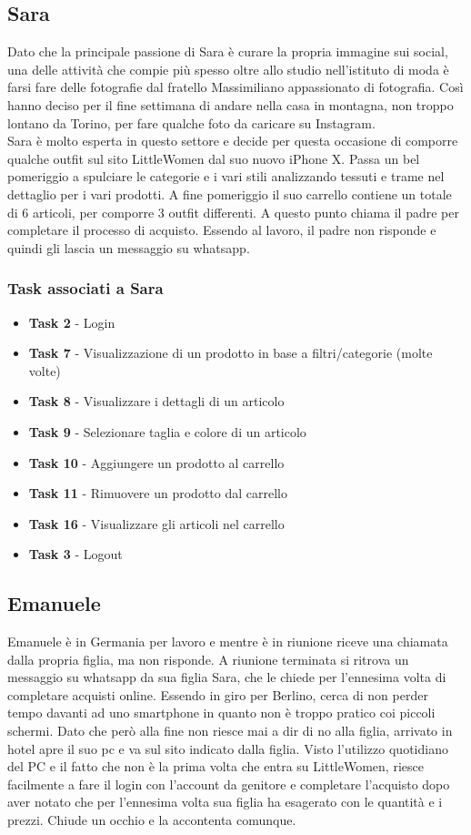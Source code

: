 \documentclass[12pt,a4paper]{report}
\begin{document}
\subsection*{Sara}
Dato che la principale passione di Sara è curare la propria immagine sui social, una delle attività che compie più spesso oltre allo studio nell'istituto di moda è farsi fare delle fotografie dal fratello Massimiliano appassionato di fotografia. Così hanno deciso per il fine settimana di andare nella casa in montagna, non troppo lontano da Torino, per fare qualche foto da caricare su Instagram.\\
Sara è molto esperta in questo settore e decide per questa occasione di comporre qualche outfit sul sito LittleWomen dal suo nuovo iPhone X. Passa un bel pomeriggio a spulciare le categorie e i vari stili analizzando tessuti e trame nel dettaglio per i vari prodotti. A fine pomeriggio il suo carrello contiene un totale di 6 articoli, per comporre 3 outfit differenti. A questo punto chiama il padre per completare il processo di acquisto. Essendo al lavoro, il padre non risponde e quindi gli lascia un messaggio su whatsapp.
\subsubsection*{Task associati a Sara}
\begin{itemize}
\item \textbf{Task 2} - Login
\item \textbf{Task 7} - Visualizzazione di un prodotto in base a filtri/categorie (molte volte)
\item \textbf{Task 8} - Visualizzare i dettagli di un articolo
\item \textbf{Task 9} - Selezionare taglia e colore di un articolo
\item \textbf{Task 10} - Aggiungere un prodotto al carrello
\item \textbf{Task 11} - Rimuovere un prodotto dal carrello
\item \textbf{Task 16} - Visualizzare gli articoli nel carrello
\item \textbf{Task 3} - Logout
\end{itemize}

\subsection*{Emanuele}
Emanuele è in Germania per lavoro e mentre è in riunione riceve una chiamata dalla propria figlia, ma non risponde. A riunione terminata si ritrova un messaggio su whatsapp da sua figlia Sara, che le chiede per l'ennesima volta di completare acquisti online. Essendo in giro per Berlino, cerca di non perder tempo davanti ad uno smartphone in quanto non è troppo pratico coi piccoli schermi. Dato che però alla fine non riesce mai a dir di no alla figlia, arrivato in hotel apre il suo pc e va sul sito indicato dalla figlia. Visto l'utilizzo quotidiano del PC e il fatto che non è la prima volta che entra su LittleWomen, riesce facilmente a fare il login con l'account da genitore e completare l'acquisto dopo aver notato che per l'ennesima volta sua figlia ha esagerato con le quantità e i prezzi. Chiude un occhio e la accontenta comunque.
\end{document}
